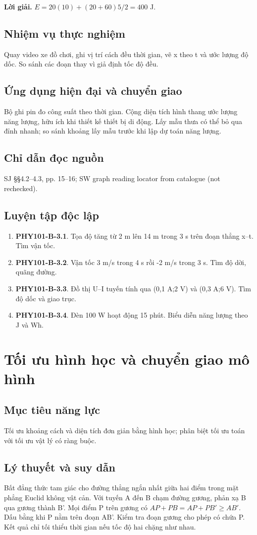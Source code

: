 \documentclass[11pt,a4paper,openany]{book}
\begin{document}
\textbf{Lời giải.} $E=20(10)+(20+60)5/2=400$ J.
\section{Nhiệm vụ thực nghiệm}
Quay video xe đồ chơi, ghi vị trí cách đều thời gian, vẽ x theo t và ước lượng độ dốc. So sánh các đoạn thay vì giả định tốc độ đều.
\section{Ứng dụng hiện đại và chuyển giao}
Bộ ghi pin đo công suất theo thời gian. Cộng diện tích hình thang ước lượng năng lượng, hữu ích khi thiết kế thiết bị di động. Lấy mẫu thưa có thể bỏ qua đỉnh nhanh; so sánh khoảng lấy mẫu trước khi lập dự toán năng lượng.
\section{Chỉ dẫn đọc nguồn}
SJ §§4.2–4.3, pp. 15–16; SW graph reading locator from catalogue (not rechecked).
\section{Luyện tập độc lập}
\begin{enumerate}
\item \textbf{PHY101-B-3.1}. Tọa độ tăng từ 2 m lên 14 m trong 3 s trên đoạn thẳng x–t. Tìm vận tốc.
\item \textbf{PHY101-B-3.2}. Vận tốc 3 m/s trong 4 s rồi -2 m/s trong 3 s. Tìm độ dời, quãng đường.
\item \textbf{PHY101-B-3.3}. Đồ thị U–I tuyến tính qua (0,1 A;2 V) và (0,3 A;6 V). Tìm độ dốc và giao trục.
\item \textbf{PHY101-B-3.4}. Đèn 100 W hoạt động 15 phút. Biểu diễn năng lượng theo J và Wh.
\end{enumerate}
\chapter{Tối ưu hình học và chuyển giao mô hình}
\section{Mục tiêu năng lực}
Tối ưu khoảng cách và diện tích đơn giản bằng hình học; phân biệt tối ưu toán với tối ưu vật lý có ràng buộc.
\section{Lý thuyết và suy dẫn}
Bất đẳng thức tam giác cho đường thẳng ngắn nhất giữa hai điểm trong mặt phẳng Euclid không vật cản. Với tuyến A đến B chạm đường gương, phản xạ B qua gương thành B'. Mọi điểm P trên gương có $AP+PB=AP+PB'\ge AB'$. Dấu bằng khi P nằm trên đoạn AB'. Kiểm tra đoạn gương cho phép có chứa P. Kết quả chỉ tối thiểu thời gian nếu tốc độ hai chặng như nhau.
\end{document}
